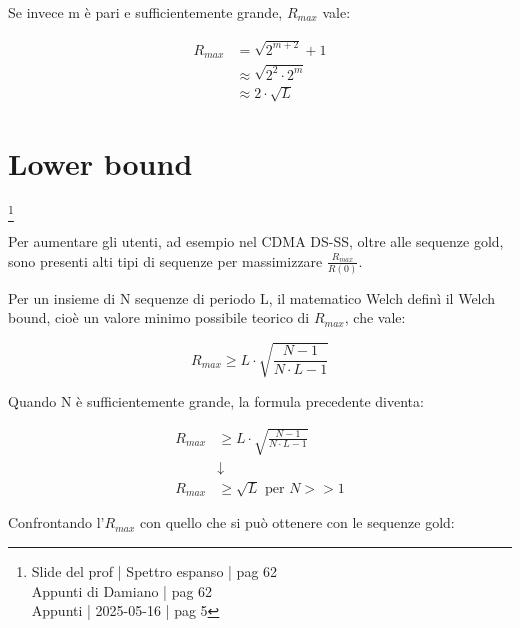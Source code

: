 Se invece m è pari e sufficientemente grande, $R_{max}$ vale: 

{
    \Large 
    \begin{equation}
        \begin{split}
            R_{max} 
            &= 
            \sqrt{2^{m+2}} + 1 
            \\
            &\approx 
            \sqrt{2^{2} \cdot 2^{m}}
            \\
            &\approx
            2 \cdot \sqrt{ L}
        \end{split}
    \end{equation}
}

\newpage 

\section{Lower bound}
\footnote{Slide del prof | Spettro espanso | pag 62 \\
Appunti di Damiano | pag 62 \\
Appunti | 2025-05-16 | pag 5 
} 

Per aumentare gli utenti, ad esempio nel CDMA DS-SS, 
oltre alle sequenze gold, 
sono presenti alti tipi di sequenze per massimizzare $\frac{R_{max}}{R(0)}$. \newline 

Per un insieme di N sequenze di periodo L, 
il matematico Welch definì il Welch bound, cioè un valore minimo possibile teorico di $R_{max}$, 
che vale: 

{
    \Large
    \begin{equation}
        R_{max}
        \geq 
        L \cdot \sqrt{\frac{N -1}{N \cdot L - 1}}
    \end{equation}
}

Quando N è sufficientemente grande, 
la formula precedente diventa: 

{
    \Large
    \begin{equation}
        \begin{split}
        R_{max}
        &\geq 
        L \cdot \sqrt{\frac{N -1}{N \cdot L - 1}}
        \\
        &\downarrow
        \\
        R_{max}
        &\geq 
        \sqrt{L} \text{ per } N >> 1
        \end{split}
    \end{equation}
}

Confrontando l'$R_{max}$ con quello 
che si può ottenere con le sequenze gold: 

